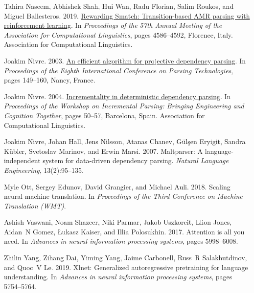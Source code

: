 \documentclass[11pt,a4paper]{article}
\begin{document}
\begin{thebibliography}{34}
Tahira Naseem, Abhishek Shah, Hui Wan, Radu Florian, Salim Roukos, and Miguel
  Ballesteros. 2019.
\newblock \href {https://doi.org/10.18653/v1/P19-1451} {Rewarding {S}match:
  Transition-based {AMR} parsing with reinforcement learning}.
\newblock In \emph{Proceedings of the 57th Annual Meeting of the Association
  for Computational Linguistics}, pages 4586--4592, Florence, Italy.
  Association for Computational Linguistics.

Joakim Nivre. 2003.
\newblock \href {https://www.aclweb.org/anthology/W03-3017} {An efficient
  algorithm for projective dependency parsing}.
\newblock In \emph{Proceedings of the Eighth International Conference on
  Parsing Technologies}, pages 149--160, Nancy, France.

Joakim Nivre. 2004.
\newblock \href {https://www.aclweb.org/anthology/W04-0308} {Incrementality in
  deterministic dependency parsing}.
\newblock In \emph{Proceedings of the Workshop on Incremental Parsing: Bringing
  Engineering and Cognition Together}, pages 50--57, Barcelona, Spain.
  Association for Computational Linguistics.

Joakim Nivre, Johan Hall, Jens Nilsson, Atanas Chanev, G{\"u}l{\c{s}}en
  Eryigit, Sandra K{\"u}bler, Svetoslav Marinov, and Erwin Marsi. 2007.
\newblock Maltparser: A language-independent system for data-driven dependency
  parsing.
\newblock \emph{Natural Language Engineering}, 13(2):95--135.

Myle Ott, Sergey Edunov, David Grangier, and Michael Auli. 2018.
\newblock Scaling neural machine translation.
\newblock In \emph{Proceedings of the Third Conference on Machine Translation
  (WMT)}.

Ashish Vaswani, Noam Shazeer, Niki Parmar, Jakob Uszkoreit, Llion Jones,
  Aidan~N Gomez, {\L}ukasz Kaiser, and Illia Polosukhin. 2017.
\newblock Attention is all you need.
\newblock In \emph{Advances in neural information processing systems}, pages
  5998--6008.

Zhilin Yang, Zihang Dai, Yiming Yang, Jaime Carbonell, Russ~R Salakhutdinov,
  and Quoc~V Le. 2019.
\newblock Xlnet: Generalized autoregressive pretraining for language
  understanding.
\newblock In \emph{Advances in neural information processing systems}, pages
  5754--5764.


\end{thebibliography}
\end{document}
